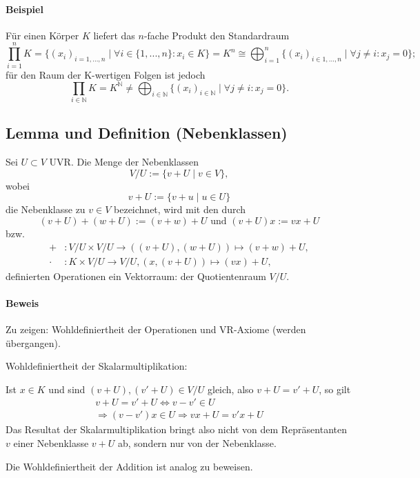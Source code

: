 \paragraph{Beispiel}
	Für einen Körper $ K $ liefert das $ n $-fache Produkt den Standardraum
		\[\prod_{i=1}^{n}K = \{(x_i)_{i = 1,...,n}\mid\forall i \in \{1,...,n\}: x_i \in K\} = K^n \cong \bigoplus_{i=1}^n\{(x_i)_{i\in {1,...,n}}\mid\forall j\neq i: x_j = 0\};\]
	für den Raum der K-wertigen Folgen ist jedoch
		\[\prod_{i\in \mathbb{N}}K=K^{\mathbb{N}}\neq\bigoplus_{i\in \mathbb{N}}\{(x_i)_{i\in \mathbb{N}}\mid\forall j\neq i: x_j=0\}.\]
			
\subsection{Lemma und Definition (Nebenklassen)}
	\begin{Definition}[Nebenklassen]
		Sei $U\subset V$ UVR. Die Menge der Nebenklassen 
		\[V/U := \{v+U\mid v\in V\},\]
	wobei
		\[v+U:=\{v+u\mid u\in U\}\]
	die Nebenklasse zu $v\in V$ bezeichnet, wird mit den durch
		\[(v+U)+(w+U):=(v+w)+U \text{ und }(v+U)x := vx + U\]
	bzw.
		\begin{align*}
			+&: V/U \times V/U \to ((v+U),(w+U))\mapsto (v+w)+U,\\
			\cdot &: K\times V/U \to V/U, (x,(v+U))\mapsto (vx)+U,
		\end{align*}
	definierten Operationen ein Vektorraum: der Quotientenraum $V/U$.
	\end{Definition}
			
\paragraph{Beweis}
	Zu zeigen: Wohldefiniertheit der Operationen und VR-Axiome (werden übergangen).
	
	Wohldefiniertheit der Skalarmultiplikation:
	
	Ist $x\in K$ und sind $(v+U),(v'+U)\in V/U$ gleich, also $v+U = v'+U$, so gilt
		\begin{gather*}
		v+U = v'+U \Leftrightarrow v - v'\in U\\
		\Rightarrow (v-v')x \in U \Rightarrow vx+U=v' x+U
		\end{gather*}
	Das Resultat der Skalarmultiplikation bringt also nicht von dem Repräsentanten $v$ einer Nebenklasse $v+U$ ab, sondern nur von der Nebenklasse.
	
	Die Wohldefiniertheit der Addition ist analog zu beweisen.

